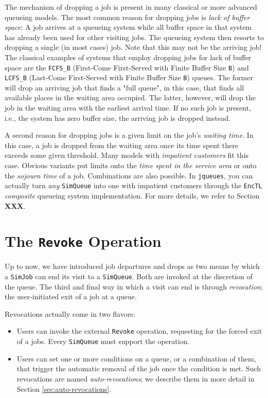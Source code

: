 The mechanism of dropping a job
  is present in many classical or
  more advanced queueing models.
The most common reason for dropping jobs
  is {\em lack of buffer space\/}:
A job arrives at a queueing system
  while all buffer space in that system
  has already been used for other
  visiting jobs.
The queueing system then resorts to dropping
  a single (in most cases) job.
Note that this may not be the arriving job!
The classical examples of systems that employ dropping
  jobs for lack of buffer space are the
  \lstinline|FCFS_B| (First-Come First-Served with Finite
  Buffer Size \lstinline|B|)
  and \lstinline|LCFS_B| (Last-Come First-Served with Finite
  Buffer Size \lstinline|B|) queues.
The former will drop an arriving job that finds
  a "full queue",
  in this case,
  that finds all available places in the waiting area
  occupied.
The latter, however,
  will drop the job in the waiting area
  with the earliest arrival time.
If no such job is present,
  i.e.,
  the system has zero buffer size,
  the arriving job is dropped instead.
  
A second reason for dropping jobs
  is a given limit on the job's {\em waiting time}.
In this case,
  a job is dropped from the waiting area
  once its time spent there
  exceeds some given threshold.
Many models with {\em impatient customers\/}
  fit this case.
Obvious variants put limits
  onto the {\em time spent in the service area}
  or onto the {\em sojourn time\/} of a job.
Combinations are also possible.
In \lstinline|jqueues|,
  you can actually turn {\em any\/}
  \lstinline|SimQueue|
  into one with impatient customers
  through the \lstinline|EncTL|
  {\em composite\/} queueing system implementation.
For more details,
  we refer to Section {\bf XXX}.
  
\section{The \texttt{\bf Revoke} Operation}
\label{sec:revoke}

Up to now,
  we have introduced job departures and drops
  as two means by which a \lstinline|SimJob|
  can end its visit to a \lstinline|SimQueue|.
Both are invoked at the discretion of the queue.
The third and final way
  in which a visit can end is through {\em revocation};
  the user-initiated exit of a job at a queue.
  
Revocations actually come in two flavors:
\begin{itemize}
	\item
	Users can invoke the external \lstinline|Revoke| operation,
	  requesting for the forced exit of a jobs.
	Every \lstinline|SimQueue| must support the operation.
	\item
	Users can set one or more conditions on a queue,
      or a combination of them,
      that trigger the automatic removal of the job
      once the condition is met.
	Such revocations are named {\em auto-revocations\/};
      we describe them in more detail
      in Section \ref{sec:auto-revocations}.
\end{itemize}

